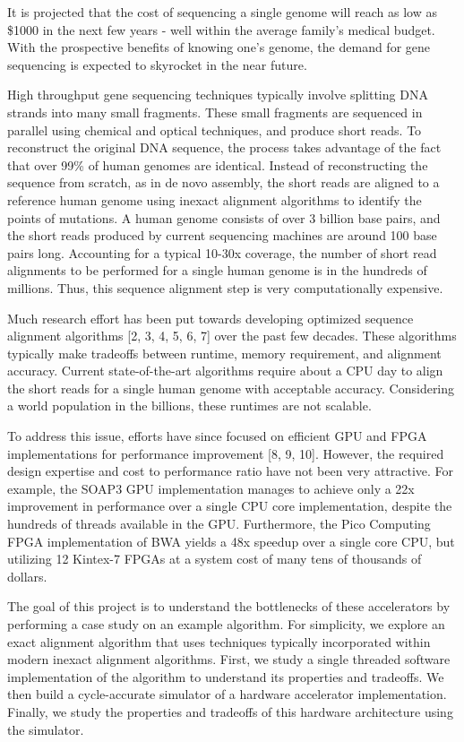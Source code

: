 \documentclass[11pt]{article}
\begin{document}
It is projected that the cost of sequencing a single genome will reach as low as \$1000 in the next few years - well within the average family’s medical budget.  With the prospective benefits of knowing one’s genome, the demand for gene sequencing is expected to skyrocket in the near future.


High throughput gene sequencing techniques typically involve splitting DNA strands into many small fragments.  These small fragments are sequenced in parallel using chemical and optical techniques, and produce short reads.  To reconstruct the original DNA sequence, the process takes advantage of the fact that over 99\% of human genomes are identical.  Instead of reconstructing the sequence from scratch, as in de novo assembly, the short reads are aligned to a reference human genome using inexact alignment algorithms to identify the points of mutations.  A human genome consists of over 3 billion base pairs, and the short reads produced by current sequencing machines are around 100 base pairs long.  Accounting for a typical 10-30x coverage, the number of short read alignments to be performed for a single human genome is in the hundreds of millions.  Thus, this sequence alignment step is very computationally expensive.


	Much research effort has been put towards developing optimized sequence alignment algorithms [2, 3, 4, 5, 6, 7] over the past few decades.  These algorithms typically make tradeoffs between runtime, memory requirement, and alignment accuracy.  Current state-of-the-art algorithms require about a CPU day to align the short reads for a single human genome with acceptable accuracy.  Considering a world population in the billions, these runtimes are not scalable.


To address this issue, efforts have since focused on efficient GPU and FPGA implementations for performance improvement [8, 9, 10].  However, the required design expertise and cost to performance ratio have not been very attractive.  For example, the SOAP3 GPU implementation manages to achieve only a 22x improvement in performance over a single CPU core implementation, despite the hundreds of threads available in the GPU.  Furthermore, the Pico Computing FPGA implementation of BWA yields a 48x speedup over a single core CPU, but utilizing 12 Kintex-7 FPGAs at a system cost of many tens of thousands of dollars.


The goal of this project is to understand the bottlenecks of these accelerators by performing a case study on an example algorithm.  For simplicity, we explore an exact alignment algorithm that uses techniques typically incorporated within modern inexact alignment algorithms.  First, we study a single threaded software implementation of the algorithm to understand its properties and tradeoffs.  We then build a cycle-accurate simulator of a hardware accelerator implementation.  Finally, we study the properties and tradeoffs of this hardware architecture using the simulator.
\end{document}
